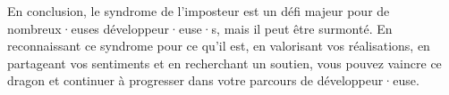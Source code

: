 En conclusion, le syndrome de l'imposteur est un défi majeur pour de nombreux·euses développeur·euse·s, mais il peut être surmonté. En reconnaissant ce syndrome pour ce qu'il est, en valorisant vos réalisations, en partageant vos sentiments et en recherchant un soutien, vous pouvez vaincre ce dragon et continuer à progresser dans votre parcours de développeur·euse.

